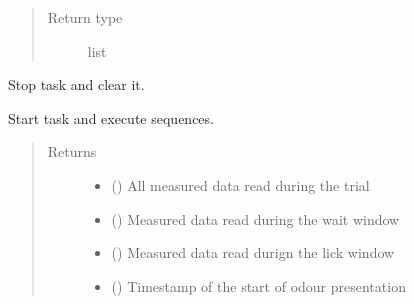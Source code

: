 \documentclass[letterpaper,10pt,english]{sphinxmanual}
\begin{document}
\begin{fulllineitems}
\begin{fulllineitems}
\begin{quote}
\begin{description}
\item[{Return type}] \leavevmode
\sphinxAtStartPar
list

\end{description}\end{quote}

\end{fulllineitems}


\begin{fulllineitems}
\label{\detokenize{NoSeMazeControl/daqface:daqface.DAQ.DoAiMultiTask.ClearTasks}}
\pysigstartsignatures
{}
\pysigstopsignatures
\sphinxAtStartPar
Stop task and clear it.

\end{fulllineitems}


\begin{fulllineitems}
\label{\detokenize{NoSeMazeControl/daqface:daqface.DAQ.DoAiMultiTask.DoTask}}
\pysigstartsignatures
{}
\pysigstopsignatures
\sphinxAtStartPar
Start task and execute sequences.
\begin{quote}\begin{description}
\item[{Returns}] \leavevmode
\sphinxAtStartPar
\begin{itemize}
\item {} 
\sphinxAtStartPar
{} () \textendash{} All measured data read during the trial

\item {} 
\sphinxAtStartPar
{} () \textendash{} Measured data read during the wait window

\item {} 
\sphinxAtStartPar
{} () \textendash{} Measured data read durign the lick window

\item {} 
\sphinxAtStartPar
{} () \textendash{} Timestamp of the start of odour presentation


\end{itemize}
\end{description}
\end{quote}
\end{fulllineitems}
\end{fulllineitems}
\end{document}
